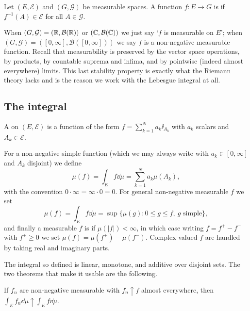 \documentclass[a4paper]{scrartcl}
\begin{document}
\begin{definition}
	Let $(E, \mathcal{E})$ and $(G, \mathcal{G})$ be measurable spaces. A function $f : E \to G$ is  if $f^{-1}(A) \in \mathcal{E}$ for all $A \in \mathcal{G}$.
\end{definition}

When $(G, \mathcal{G}) = (\mathbb{R}, \mathcal{B}(\mathbb{R}))$ or $(\mathbb{C}, \mathcal{B}(\mathbb{C}))$ we just say `$f$ is measurable on $E$'; when $(G,\mathcal{G}) = ([0,\infty], \mathcal{B}([0,\infty]))$ we say $f$ is a non-negative measurable function. Recall that measurability is preserved by the vector space operations, by products, by countable suprema and infima, and by pointwise (indeed almost everywhere) limits. This last stability property is exactly what the Riemann theory lacks and is the reason we work with the Lebesgue integral at all.

\subsection{The integral}

\begin{definition}
	A  on $(E, \mathcal{E})$ is a function of the form $f = \sum_{k=1}^N a_k \ii_{A_k}$ with $a_k$ scalars and $A_k \in \mathcal{E}$.
\end{definition}

For a non-negative simple function (which we may always write with $a_k \in [0,\infty]$ and $A_k$ disjoint) we define
$$\mu(f) = \int_E f \dd\mu = \sum_{k=1}^N a_k \mu(A_k),$$
with the convention $0 \cdot \infty = \infty \cdot 0 = 0$. For general non-negative measurable $f$ we set
$$\mu(f) = \int_E f \dd \mu = \sup\{ \mu(g) : 0 \le g \le f, \ g \text{ simple}\},$$
and finally a measurable $f$ is  if $\mu(|f|) < \infty$, in which case writing $f = f^+ - f^-$ with $f^\pm \ge 0$ we set $\mu(f) = \mu(f^+) - \mu(f^-)$. Complex-valued $f$ are handled by taking real and imaginary parts.

The integral so defined is linear, monotone, and additive over disjoint sets. The two theorems that make it usable are the following.

\begin{theorem}\label{aof-thm:mct}
	If $f_n$ are non-negative measurable with $f_n \uparrow f$ almost everywhere, then $\int_E f_n \dd\mu \uparrow \int_E f \dd \mu$.
\end{theorem}
\end{document}
